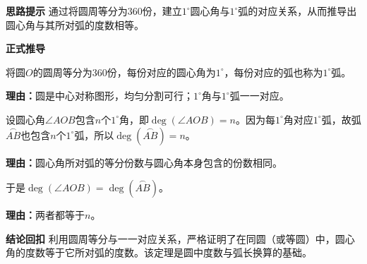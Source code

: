 \begin{proofbox}
	\textbf{\textcolor{CProof}{思路提示}}
	通过将圆周等分为360份，建立$1^{\circ}$圆心角与$1^{\circ}$弧的对应关系，从而推导出圆心角与其所对弧的度数相等。

	\medskip
	\textbf{\textcolor{CProof}{正式推导}}
	\begin{description}[style=nextline, leftmargin=2.8em, labelsep=0.5em, itemsep=0.55em]
		\item[\textbf{步骤一（等分圆周）：}] 将圆$O$的圆周等分为360份，每份对应的圆心角为$1^{\circ}$，每份对应的弧也称为$1^{\circ}$弧。
			\par\textbf{理由：}圆是中心对称图形，均匀分割可行；$1^{\circ}$角与$1^{\circ}$弧一一对应。

		\item[\textbf{步骤二（计数对应）：}] 设圆心角$\angle AOB$包含$n$个$1^{\circ}$角，即$\deg(\angle AOB)=n$。因为每$1^{\circ}$角对应$1^{\circ}$弧，故弧$\overset{\frown}{AB}$也包含$n$个$1^{\circ}$弧，所以$\deg(\overset{\frown}{AB})=n$。
			\par\textbf{理由：}圆心角所对弧的等分份数与圆心角本身包含的份数相同。

		\item[\textbf{步骤三（得出结论）：}] 于是$\deg(\angle AOB)=\deg(\overset{\frown}{AB})$。
			\par\textbf{理由：}两者都等于$n$。
	\end{description}

	\medskip
	\textbf{\textcolor{CProof}{结论回扣}}
	利用圆周等分与一一对应关系，严格证明了在同圆（或等圆）中，圆心角的度数等于它所对弧的度数。该定理是圆中度数与弧长换算的基础。
\end{proofbox}
